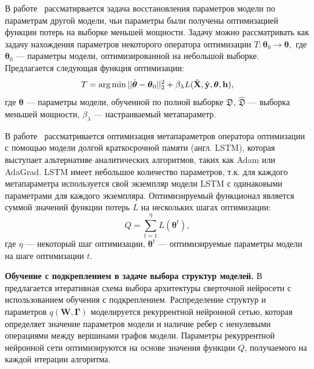В работе~\cite{l2l} рассматирвается задача восстановления параметров модели по параметрам  другой модели, чьи параметры были получены оптимизацией функции потерь на выборке меньшей мощности. Задачу можно рассматривать как задачу нахождения параметров некоторого оператора оптимизации $T:\boldsymbol{\theta}_0 \to \boldsymbol{\theta},$ где $\boldsymbol{\theta}_0$ --- параметры модели, оптимизированной на небольшой выборке.  Предлагается следующая функция оптимизации:
\[
    T = \operatorname*{arg\,min} ||\hat{\boldsymbol{\theta}} -  \boldsymbol{\theta}_0||_2^2 + \beta_{\lambda} L(\hat{\mathbf{X}}, \hat{\mathbf{y}},\boldsymbol{\theta}, \mathbf{h}),
\]
где $\boldsymbol{\theta}$ --- параметры модели, обученной по полной выборке $\mathfrak{D}$, $\hat{\mathfrak{D}}$ --- выборка меньшей мощности, $\beta_{\lambda}$ --- настраиваемый метапараметр.

В работе~\cite{l2l_by_gd_gd} рассматривается оптимизация метапараметров оператора оптимизации с помощью модели долгой краткосрочной памяти (англ. LSTM), которая выступает альтернативе аналитических алгоритмов, таких как Adam или AdaGrad. LSTM имеет небольшое количество параметров, т.к. для каждого метапараметра используется свой экземпляр модели LSTM с одинаковыми параметрами для каждого экземпляра. Оптимизируемый функционал является суммой значений функции потерь $L$ на нескольких шагах оптимизации:
\[
   Q = \sum_{t=1}^\eta L(\boldsymbol{\theta}^t),
\]
где $\eta$ --- некоторый шаг оптимизации, $\boldsymbol{\theta}^t$ --- оптимизируемые параметры модели на шаге оптимизации $t$.


\par{\textbf{ Обучение с подкреплением в задаче выбора структур моделей.}}
В~\cite{reinf} предлагается итеративная схема выбора архитектуры сверточной нейросети с использованием обучения с подкреплением. Распределение структур и параметров $q(\mathbf{W}, \boldsymbol{\Gamma})$ моделируется рекуррентной нейронной сетью, которая определяет значение параметров модели и наличие ребер с ненулевыми операциями между вершинами графов модели. Параметры рекуррентной нейронной сети оптимизируются на основе значения функции $Q$, получаемого на каждой итерации алгоритма.


